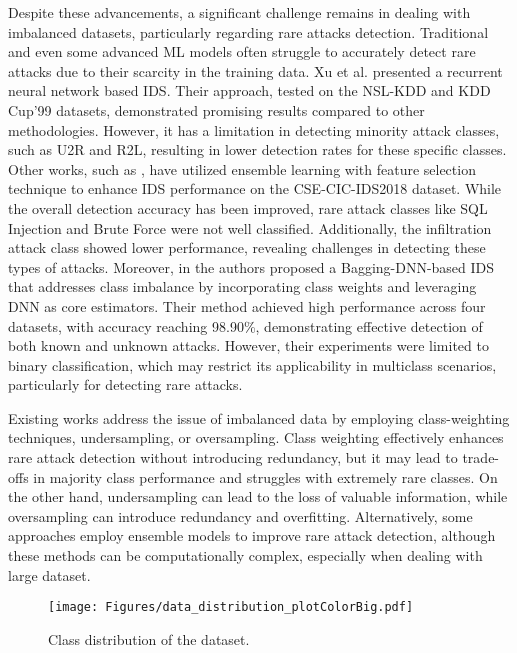 \indent Despite these advancements, a significant challenge remains in dealing with imbalanced datasets, particularly regarding rare attacks detection. Traditional and even some advanced \gls{ML} models often struggle to accurately detect rare attacks due to their scarcity in the training data. Xu et al. \cite{8449272} presented a recurrent neural network based \gls{IDS}. Their approach, tested on the NSL-KDD and KDD Cup'99 datasets, demonstrated promising results compared to other methodologies. However, it has a limitation in detecting minority attack classes, such as U2R and R2L, resulting in lower detection rates for these specific classes. Other works, such as \cite{9172014}, have utilized ensemble learning with feature selection technique to enhance IDS performance on the CSE-CIC-IDS2018 dataset. While the overall detection accuracy has been improved, rare attack classes like SQL Injection and Brute Force were not well classified. Additionally, the infiltration attack class showed lower performance, revealing challenges in detecting these types of attacks. Moreover, in \cite{10044208}  the authors proposed a Bagging-DNN-based \gls{IDS} that addresses class imbalance by incorporating class weights and leveraging \gls{DNN} as core estimators. Their method achieved high performance across four datasets, with accuracy reaching 98.90\%, demonstrating effective detection of both known and unknown attacks. However, their experiments were limited to binary classification, which may restrict its applicability in multiclass scenarios, particularly for detecting rare attacks.

Existing works address the issue of imbalanced data by employing class-weighting techniques, undersampling, or oversampling. Class weighting effectively enhances rare attack detection without introducing redundancy, but it may lead to trade-offs in majority class performance and struggles with extremely rare classes. On the other hand, undersampling can lead to the loss of valuable information, while oversampling can introduce redundancy and overfitting. Alternatively, some approaches employ ensemble models to improve rare attack detection, although these methods can be computationally complex, especially when dealing with large dataset.

 \begin{figure}[t]
\centering
\texttt{[image: Figures/data\_distribution\_plotColorBig.pdf]}
    \caption{Class distribution of the dataset.}
    \label{fig: DataDistribution}
\end{figure}

